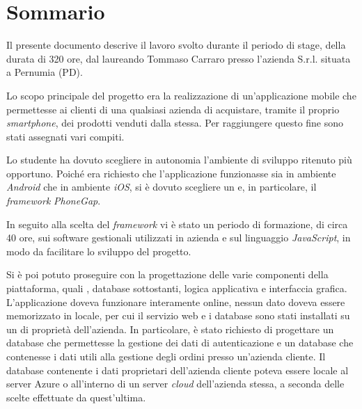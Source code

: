 
\cleardoublepage
{}
{}
\begingroup
\let\clearpage\relax
\let\cleardoublepage\relax
\let\cleardoublepage\relax

\chapter*{Sommario}

Il presente documento descrive il lavoro svolto durante il periodo di stage, della durata di 320 ore, dal laureando Tommaso Carraro presso l'azienda \visione{} S.r.l. situata a Pernumia (PD).

Lo scopo principale del progetto era la realizzazione di un'applicazione mobile che permettesse ai clienti di una qualsiasi azienda di acquistare, tramite il proprio \textit{smartphone}, dei prodotti venduti dalla stessa. Per raggiungere questo fine sono stati assegnati vari compiti.

Lo studente ha dovuto scegliere in autonomia l'ambiente di sviluppo ritenuto più opportuno. Poiché era richiesto che l'applicazione funzionasse sia in ambiente \textit{Android} che in ambiente \textit{iOS}, si è dovuto scegliere un  e, in particolare, il \textit{framework} \textit{PhoneGap}.

In seguito alla scelta del \textit{framework} vi è stato un periodo di formazione, di circa 40 ore, sui software gestionali utilizzati in azienda e sul linguaggio \textit{JavaScript}, in modo da facilitare lo sviluppo del progetto.

Si è poi potuto proseguire con la progettazione delle varie componenti della piattaforma, quali , database sottostanti, logica applicativa e interfaccia grafica. 
L'applicazione doveva funzionare interamente online, nessun dato doveva essere memorizzato in locale, per cui il servizio web e i database sono stati installati su un  di proprietà dell'azienda.
In particolare, è stato richiesto di progettare un database che permettesse la gestione dei dati di autenticazione e un database che contenesse i dati utili alla gestione degli ordini presso un'azienda cliente. Il database contenente i dati proprietari dell'azienda cliente poteva essere locale al server Azure o all'interno di un server \textit{cloud} dell'azienda stessa, a seconda delle scelte effettuate da quest'ultima.

